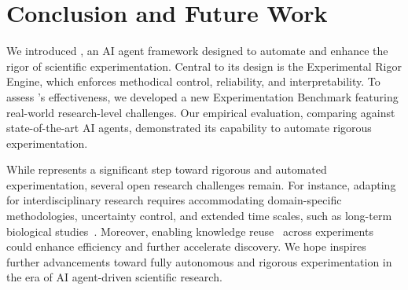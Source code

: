 \section{Conclusion and Future Work}





We introduced \sys, an AI agent framework designed to automate and enhance the rigor of scientific experimentation. 
Central to its design is the Experimental Rigor Engine, which enforces methodical control, reliability, and interpretability.
To assess \sys's effectiveness, we developed a new Experimentation Benchmark featuring real-world research-level challenges. Our empirical evaluation, comparing \sys against state-of-the-art AI agents, demonstrated its capability to automate rigorous experimentation.

While \sys represents a significant step toward rigorous and automated experimentation, several open research challenges remain.
For instance, adapting \sys for interdisciplinary research requires accommodating domain-specific methodologies, uncertainty control, and extended time scales, such as long-term biological studies~\cite{plant1}.
Moreover, enabling knowledge reuse~\cite{agentworkflowmemory} across experiments could enhance efficiency and further accelerate discovery.
We hope \sys inspires further advancements toward fully autonomous and rigorous experimentation in the era of AI agent-driven scientific research.
\fi

